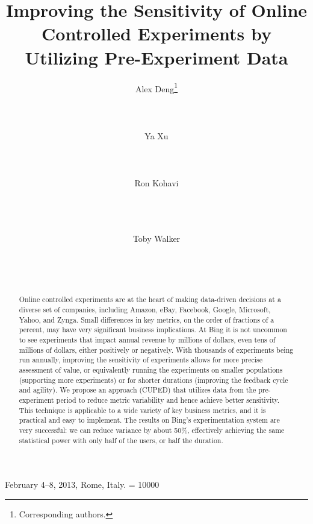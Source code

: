 \documentclass{sig-alternate}
\begin{document}
 {February 4--8, 2013, Rome, Italy.} 
\widowpenalty = 10000


\title{Improving the Sensitivity of Online Controlled Experiments by Utilizing Pre-Experiment Data}
\author{
\alignauthor
Alex Deng\thanks{Corresponding authors.}\\
       \\
       \\
       \\
\alignauthor
Ya Xu\footnotemark[1]\\
       \\
       \\
       \\
\alignauthor
Ron Kohavi\\
       \\
       \\
       \\
\and
\alignauthor
Toby Walker\\
       \\
       \\
       \\
}
\maketitle
\begin{abstract}
Online controlled experiments are at the heart of making data-driven decisions at a diverse set of  companies, including Amazon, eBay, Facebook, Google, Microsoft, Yahoo, and Zynga. Small differences in key metrics, on the order of fractions of a percent, may have very significant business implications.  At Bing it is not uncommon to see experiments that impact annual revenue by millions of dollars, even tens of millions of dollars, either positively or negatively.  With thousands of experiments being run annually, improving the sensitivity of experiments allows for more precise assessment of value, or equivalently running the experiments on smaller populations (supporting more experiments) or  for shorter durations (improving the feedback cycle and agility). We propose an approach (CUPED) that utilizes data from the pre-experiment period to reduce metric variability and hence achieve better sensitivity. This technique is applicable to a wide variety of key business metrics, and it is practical and easy to implement. The results on Bing's experimentation system are very successful:  we can reduce variance by about 50\%, effectively achieving the same statistical power with only half of the users, or half the duration.
\end{abstract}
\end{document}
